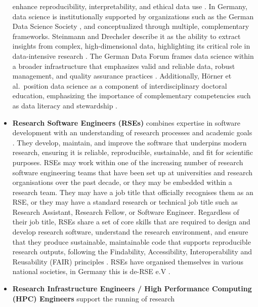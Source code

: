 \documentclass[
        english,biblatex
    ]{lni}
\begin{document}
\begin{itemize}
      enhance reproducibility, interpretability, and ethical data use
      \autocite{Donoho201750}. In Germany, data science is
      institutionally supported by organizations such as the German Data
      Science Society \autocite{George2016Big}, and conceptualized
      through multiple, complementary frameworks. Steinmann and
      Drechsler describe it as the ability to extract insights from
      complex, high-dimensional data, highlighting its critical role in
      data-intensive research \autocite{Steinmann2021Verzahnung}. The
      German Data Forum frames data science within a broader
      infrastructure that emphasizes valid and reliable data, robust
      management, and quality assurance practices
      \autocite{ed2011Building}. Additionally, Hörner et al.~position
      data science as a component of interdisciplinary doctoral
      education, emphasizing the importance of complementary
      competencies such as data literacy and stewardship
      \autocite{Horner2021Disziplinubergreifendes}.
    \item
      \textbf{Research Software Engineers (RSEs)} combines expertise in
      software development with an understanding of research processes
      and academic goals \autocite{zenodo495360}. They develop,
      maintain, and improve the software that underpins modern research,
      ensuring it is reliable, reproducible, sustainable, and fit for
      scientific purposes. RSEs may work within one of the increasing
      number of research software engineering teams that have been set
      up at universities and research organisations over the past
      decade, or they may be embedded within a research team. They may
      have a job title that officially recognises them as an RSE, or
      they may have a standard research or technical job title such as
      Research Assistant, Research Fellow, or Software Engineer.
      Regardless of their job title, RSEs share a set of core skills
      that are required to design and develop research software,
      understand the research environment, and ensure that they produce
      sustainable, maintainable code that supports reproducible research
      outputs, following the Findability, Accessibility,
      Interoperability and Reusability (FAIR) principles
      \autocite{gorgolewski2017bids}. RSEs have organised themselves in
      various national societies, in Germany this is de-RSE e.V
      \autocite{derseev}.
    \item
      \textbf{Research Infrastructure Engineers / High Performance
      Computing (HPC) Engineers} support the running of research

\end{itemize}
\end{document}
